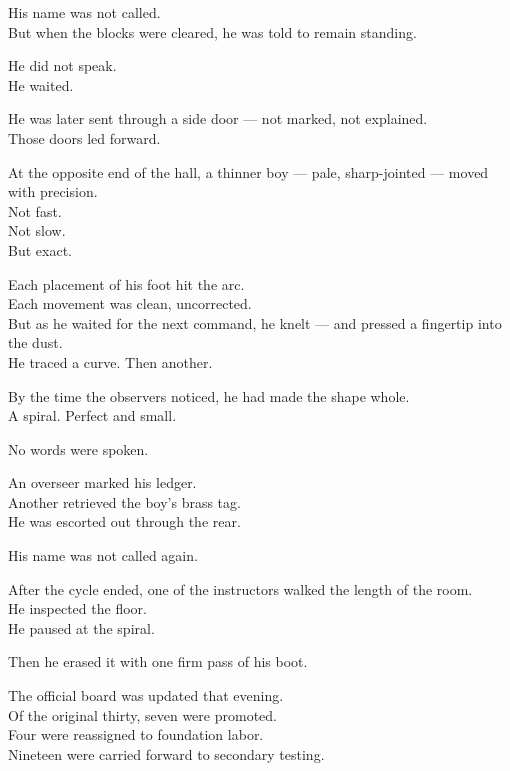 \documentclass[12pt]{article}
\begin{document}
His name was not called.\\
But when the blocks were cleared, he was told to remain standing.

He did not speak.\\
He waited.

He was later sent through a side door — not marked, not explained.\\
Those doors led forward.

\vspace{1em}

At the opposite end of the hall, a thinner boy — pale, sharp-jointed — moved with precision.\\
Not fast.\\
Not slow.\\
But exact.

Each placement of his foot hit the arc.\\
Each movement was clean, uncorrected.\\
But as he waited for the next command, he knelt — and pressed a fingertip into the dust.\\
He traced a curve. Then another.

By the time the observers noticed, he had made the shape whole.\\
A spiral. Perfect and small.

No words were spoken.

An overseer marked his ledger.\\
Another retrieved the boy’s brass tag.\\
He was escorted out through the rear.

His name was not called again.

\vspace{1em}

After the cycle ended, one of the instructors walked the length of the room.\\
He inspected the floor.\\
He paused at the spiral.

Then he erased it with one firm pass of his boot.

\vspace{1em}

The official board was updated that evening.\\
Of the original thirty, seven were promoted.\\
Four were reassigned to foundation labor.\\
Nineteen were carried forward to secondary testing.
\end{document}
